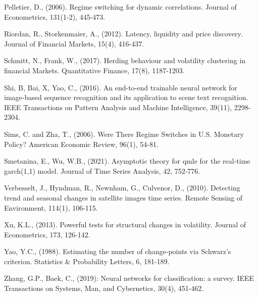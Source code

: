 \documentclass[preprint,12pt,authoryear]{elsarticle}
\begin{document}
\begin{thebibliography}{00}
 Pelletier, D., (2006). Regime switching for dynamic correlations. Journal of Econometrics, 131(1-2), 445-473.

 Riordan, R., Storkenmaier, A., (2012). Latency, liquidity and price discovery. Journal of Financial Markets, 15(4), 416-437.

 Schmitt, N., Frank, W., (2017). Herding behaviour and
volatility clustering in financial Markets. Quantitative Finance,
17(8), 1187-1203.

 Shi, B, Bai, X, Yao, C., (2016). An end-to-end trainable neural network for image-based sequence recognition and its application to scene text recognition. IEEE Transactions on Pattern Analysis and Machine Intelligence, 39(11), 2298-2304.

Sims, C. and Zha, T., (2006). Were There Regime Switches in U.S. Monetary Policy? American Economic Review, 96(1), 54-81.

 Smetanina, E., Wu, W.B., (2021). Asymptotic theory for qmle for the real-time garch(1,1)
model. Journal of Time Series Analysis, 42, 752-776.

 Verbesselt, J., Hyndman, R., Newnham, G., Culvenor, D., (2010). Detecting trend and seasonal changes in satellite images time series. Remote Sensing of Environment,
114(1), 106-115.

 Xu, K.L., (2013). Powerful tests for structural changes in volatility. Journal of Econometrics, 173, 126-142.

 Yao, Y.C., (1988). Estimating the number of change-points via Schwarz’s criterion. Statistics \& Probability Letters, 6, 181-189.

 Zhang, G.P., Baek, C., (2019): Neural networks for classification: a survey. IEEE Transactions on Systems, Man, and Cybernetics, 30(4), 451-462.
\end{thebibliography}

% 

% 



\newpage
\clearpage \setcounter{table}{0}
\renewcommand{\thetable}{\arabic{table}}
\end{document}
